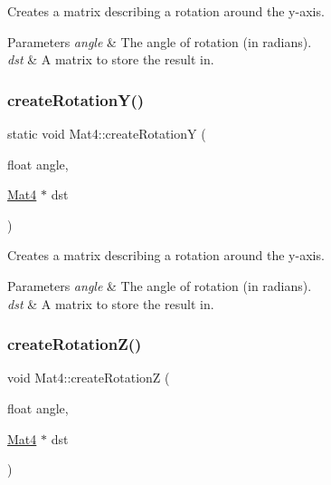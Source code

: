 Creates a matrix describing a rotation around the y-\/axis.


\begin{DoxyParams}{Parameters}
{\em angle} & The angle of rotation (in radians). \\
\hline
{\em dst} & A matrix to store the result in. \\
\hline
\end{DoxyParams}
\mbox{\label{classMat4_a24d60181510705304b5dffd42fb12b29}} 
\subsubsection{\texorpdfstring{create\+Rotation\+Y()}{createRotationY()}\hspace{0.1cm}{\footnotesize\ttfamily [2/2]}}
{\footnotesize\ttfamily static void Mat4\+::create\+RotationY (\begin{DoxyParamCaption}\item[{float}]{angle,  }\item[{\hyperlink{classMat4}{Mat4} $\ast$}]{dst }\end{DoxyParamCaption})\hspace{0.3cm}{\ttfamily [static]}}

Creates a matrix describing a rotation around the y-\/axis.


\begin{DoxyParams}{Parameters}
{\em angle} & The angle of rotation (in radians). \\
\hline
{\em dst} & A matrix to store the result in. \\
\hline
\end{DoxyParams}
\mbox{\label{classMat4_a01b92c6d9e1d8706b2288f7159411207}} 
\subsubsection{\texorpdfstring{create\+Rotation\+Z()}{createRotationZ()}\hspace{0.1cm}{\footnotesize\ttfamily [1/2]}}
{\footnotesize\ttfamily void Mat4\+::create\+RotationZ (\begin{DoxyParamCaption}\item[{float}]{angle,  }\item[{\hyperlink{classMat4}{Mat4} $\ast$}]{dst }\end{DoxyParamCaption})\hspace{0.3cm}{\ttfamily [static]}}


